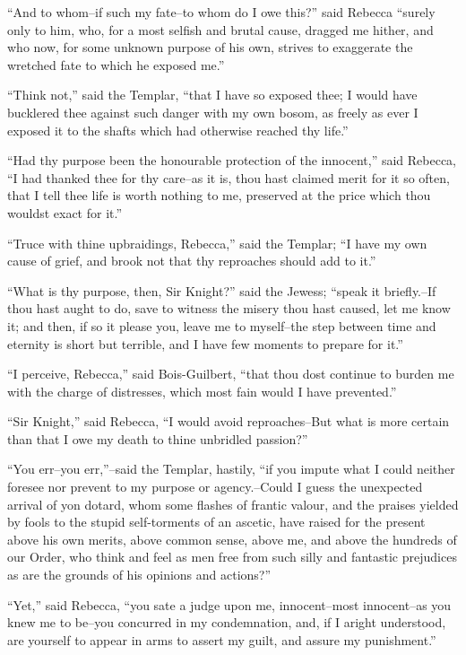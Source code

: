 ``And to whom--if such my fate--to whom do I owe this?'' said Rebecca
``surely only to him, who, for a most selfish and brutal cause, dragged
me hither, and who now, for some unknown purpose of his own, strives to
exaggerate the wretched fate to which he exposed me.''

``Think not,'' said the Templar, ``that I have so exposed thee; I would
have bucklered thee against such danger with my own bosom, as freely as
ever I exposed it to the shafts which had otherwise reached thy life.''

``Had thy purpose been the honourable protection of the innocent,'' said
Rebecca, ``I had thanked thee for thy care--as it is, thou hast claimed
merit for it so often, that I tell thee life is worth nothing to me,
preserved at the price which thou wouldst exact for it.''

``Truce with thine upbraidings, Rebecca,'' said the Templar; ``I have my
own cause of grief, and brook not that thy reproaches should add to
it.''

``What is thy purpose, then, Sir Knight?'' said the Jewess; ``speak it
briefly.--If thou hast aught to do, save to witness the misery thou hast
caused, let me know it; and then, if so it please you, leave me to
myself--the step between time and eternity is short but terrible, and I
have few moments to prepare for it.''

``I perceive, Rebecca,'' said Bois-Guilbert, ``that thou dost continue
to burden me with the charge of distresses, which most fain would I have
prevented.''

``Sir Knight,'' said Rebecca, ``I would avoid reproaches--But what is
more certain than that I owe my death to thine unbridled passion?''

``You err--you err,''--said the Templar, hastily, ``if you impute what I
could neither foresee nor prevent to my purpose or agency.--Could I
guess the unexpected arrival of yon dotard, whom some flashes of frantic
valour, and the praises yielded by fools to the stupid self-torments of
an ascetic, have raised for the present above his own merits, above
common sense, above me, and above the hundreds of our Order, who think
and feel as men free from such silly and fantastic prejudices as are the
grounds of his opinions and actions?''

``Yet,'' said Rebecca, ``you sate a judge upon me, innocent--most
innocent--as you knew me to be--you concurred in my condemnation, and,
if I aright understood, are yourself to appear in arms to assert my
guilt, and assure my punishment.''

